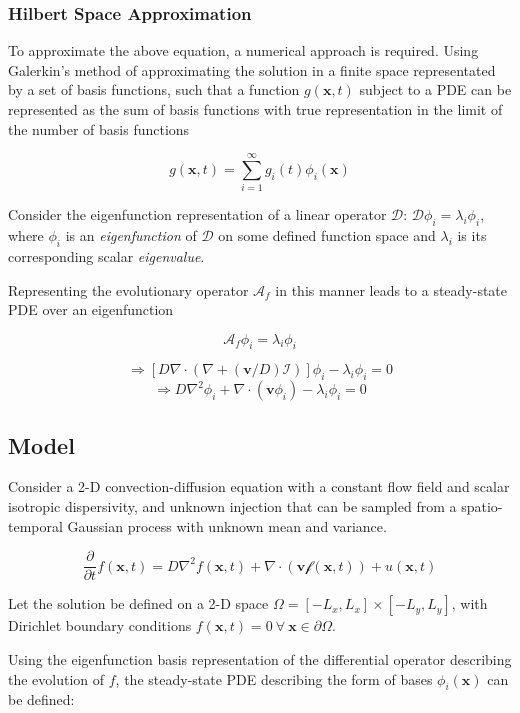\documentclass[11pt]{article}
\begin{document}
    \subsubsection{Hilbert Space
Approximation}\label{hilbert-space-approximation}

To approximate the above equation, a numerical approach is required.
Using Galerkin's method of approximating the solution in a finite space
representated by a set of basis functions, such that a function
\(g(\mathbf{x},t)\) subject to a PDE can be represented as the sum of
basis functions with true representation in the limit of the number of
basis functions

\[
    g(\mathbf{x},t) = \sum^\infty_{i=1} g_i(t)\phi_i(\mathbf{x})
\]

Consider the eigenfunction representation of a linear operator
\(\mathscr{D}\): \(\mathscr{D}\phi_i = \lambda_i\phi_i\), where
\(\phi_i\) is an \emph{eigenfunction} of \(\mathscr{D}\) on some defined
function space and \(\lambda_i\) is its corresponding scalar
\emph{eigenvalue}.

Representing the evolutionary operator \(\mathscr{A}_f\) in this manner
leads to a steady-state PDE over an eigenfunction

\[
    \mathscr{A}_f\phi_i = \lambda_i\phi_i
\]

\[
\Rightarrow \left[D\nabla\cdot\left(\nabla + (\mathbf{v}/D)\mathcal{I}\right)\right]\phi_i - \lambda_i\phi_i = 0
\] \[
\Rightarrow D\nabla^2\phi_i + \nabla\cdot\left(\mathbf{v}\phi_i\right) - \lambda_i\phi_i = 0
\]

    \subsection{Model}\label{model}

Consider a 2-D convection-diffusion equation with a constant flow field
and scalar isotropic dispersivity, and unknown injection that can be
sampled from a spatio-temporal Gaussian process with unknown mean and
variance.

\[
    \frac{\partial}{\partial t}f(\mathbf{x},t) = D\nabla^2f(\mathbf{x},t) + \nabla\cdot\left(\mathbf{v}\mathcal{f}(\mathbf{x}, t)\right) + u(\mathbf{x}, t)
\]

Let the solution be defined on a 2-D space
\(\Omega = [-L_x, L_x] \times [-L_y, L_y]\), with Dirichlet boundary
conditions
\(f(\mathbf{x}, t) = 0\ \forall\ \mathbf{x} \in \partial\Omega\).

Using the eigenfunction basis representation of the differential
operator describing the evolution of \(f\), the steady-state PDE
describing the form of bases \(\phi_i(\mathbf{x})\) can be defined:
\end{document}
